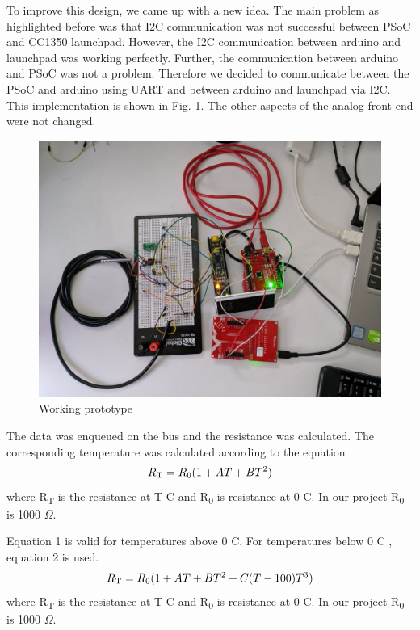 \documentclass[conference]{IEEEtran}
\begin{document}
To improve this design, we came up with a new idea. The main problem as highlighted before was that I2C communication was not successful between PSoC and CC1350 launchpad. However, the I2C communication between arduino and launchpad was working perfectly. Further, the communication between arduino and PSoC was not a problem. Therefore we decided to communicate between the PSoC and arduino using UART and between arduino and launchpad via I2C. This implementation is shown in Fig. \ref{fig:full}. The other aspects of the analog front-end were not changed.

\begin{figure}[htbp]
	\centerline{\includegraphics[width=\columnwidth, height=0.3\textheight]{07_full_circuit}}
	\caption{Working prototype}
	\label{fig:full}
\end{figure}


The data was enqueued on the bus and the resistance was calculated. The corresponding temperature was calculated according to the equation \cite{b5}
\begin{equation}
	R\textsubscript{T} = R\textsubscript{0} (1 + AT + BT\textsuperscript{2})
\end{equation}
 where 	R\textsubscript{T}  is the resistance at T \textdegree C and R\textsubscript{0} is resistance at $0$ \textdegree C. In our project R\textsubscript{0} is 1000 $\Omega$. 
 
 Equation 1 is valid for temperatures above $0$ \textdegree C.  For temperatures below $0$ \textdegree C \cite{b5}, equation 2 is used.
 \begin{equation}
 R\textsubscript{T} = R\textsubscript{0} (1 + AT + BT\textsuperscript{2} + C(T-100)T\textsuperscript{3})
 \end{equation}
 where 	R\textsubscript{T}  is the resistance at T \textdegree C and R\textsubscript{0} is resistance at $0$ \textdegree C. In our project R\textsubscript{0} is 1000 $\Omega$. 
 
\end{document}
